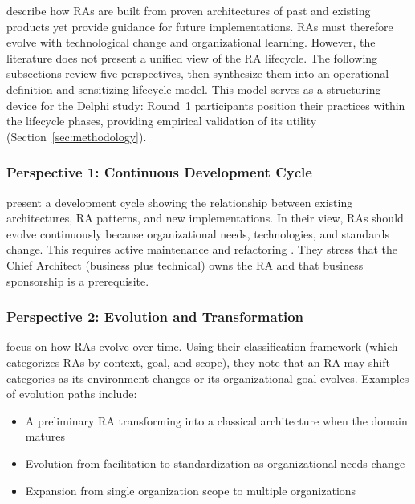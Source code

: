 \textcite{cloutier_concept_2010} describe how RAs are built from proven
architectures of past and existing products yet provide guidance for future
implementations. RAs must therefore evolve with technological change and
organizational learning. However, the literature does not present a unified view
of the RA lifecycle. The following subsections review five perspectives, then
synthesize them into an operational definition and sensitizing lifecycle model.
This model serves as a structuring device for the Delphi study: Round~1
participants position their practices within the lifecycle phases, providing
empirical validation of its utility (Section~\ref{sec:methodology}).

\subsubsection{Perspective 1: Continuous Development Cycle}

\textcite{cloutier_concept_2010} present a development cycle showing the
relationship between existing architectures, RA patterns, and new
implementations. In their view, RAs should evolve continuously because
organizational needs, technologies, and standards change. This requires active
maintenance and refactoring \parencite{cloutier_concept_2010}. They stress that
the Chief Architect (business plus technical) owns the RA and that business
sponsorship is a prerequisite.

\subsubsection{Perspective 2: Evolution and Transformation}

\textcite{angelov_framework_2012} focus on how RAs evolve over time. Using
their classification framework (which categorizes RAs by context, goal, and
scope), they note that an RA may shift categories as its environment changes or
its organizational goal evolves. Examples of evolution paths include:

\begin{itemize}
      \item A preliminary RA transforming into a classical architecture when the
            domain matures
      \item Evolution from facilitation to standardization as organizational
            needs change
      \item Expansion from single organization scope to multiple organizations
\end{itemize}

